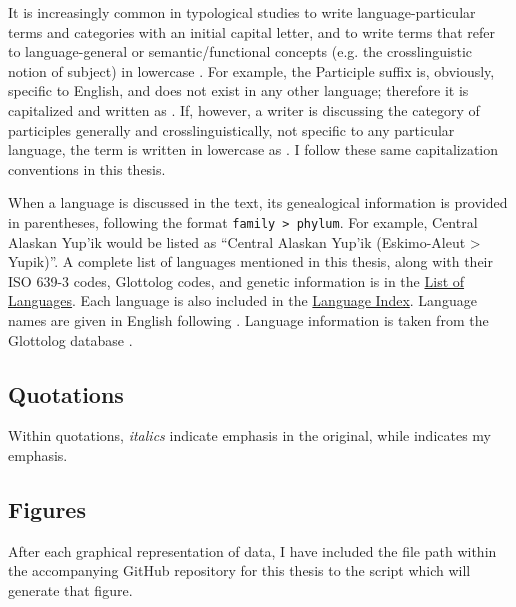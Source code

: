 It is increasingly common in typological studies to write language-particular terms and categories with an initial capital letter, and to write terms that refer to language-general or semantic/functional concepts (e.g. the crosslinguistic notion of subject) in lowercase \parencites[10]{Comrie1976}[47 (fn. 3), 141]{Bybee1985}[66]{Croft2000}[674]{Haspelmath2010a}[535]{Croft2014}. For example, the  Participle suffix  is, obviously, specific to English, and does not exist in any other language; therefore it is capitalized and written as . If, however, a writer is discussing the category of participles generally and crosslinguistically, not specific to any particular language, the term is written in lowercase as . I follow these same capitalization conventions in this thesis.

When a language is discussed in the text, its genealogical information is provided in parentheses, following the format \texttt{family > phylum}. For example, Central Alaskan Yup'ik would be listed as \enquote{Central Alaskan Yup'ik (Eskimo-Aleut > Yupik)}. A complete list of languages mentioned in this thesis, along with their ISO 639-3 codes, Glottolog codes, and genetic information is in the \hyperref[ch:languages]{List of Languages}. Each language is also included in the \hyperref[ch:index]{Language Index}. Language names are given in English following \textcite{Haspelmath2017}. Language information is taken from the Glottolog database \parencite{HammarstromForkelHaspelmath2019}.

\subsection*{Quotations}

Within quotations, \emph{italics} indicate emphasis in the original, while  indicates my emphasis.

\subsection*{Figures}

After each graphical representation of data, I have included the file path within the accompanying GitHub repository for this thesis to the script which will generate that figure.
